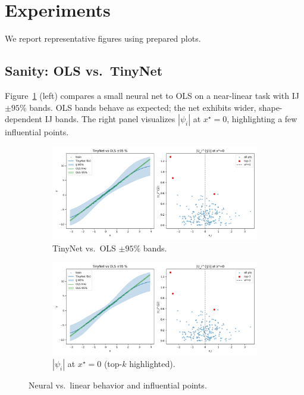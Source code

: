 \documentclass[11pt]{article}
\begin{document}
\section{Experiments}
We report representative figures using prepared plots.

\subsection*{Sanity: OLS vs.\ TinyNet}
Figure~\ref{fig:tiny-ols} (left) compares a small neural net to OLS on a near-linear task with IJ $\pm95\%$ bands. OLS bands behave as expected; the net exhibits wider, shape-dependent IJ bands. The right panel visualizes $|\psi_i|$ at $x^\star=0$, highlighting a few influential points.

\begin{figure}[t]
  \centering
  \begin{subfigure}{0.49\linewidth}
    \includegraphics[width=\linewidth]{Figure_1.png}
    \caption{TinyNet vs.\ OLS $\pm95\%$ bands.}
  \end{subfigure}\hfill
  \begin{subfigure}{0.49\linewidth}
    \includegraphics[width=\linewidth]{Figure_1.png}
    \caption{$|\psi_i|$ at $x^\star{=}0$ (top-$k$ highlighted).}
  \end{subfigure}
  \caption{Neural vs.\ linear behavior and influential points.}
  \label{fig:tiny-ols}
\end{figure}
\end{document}
